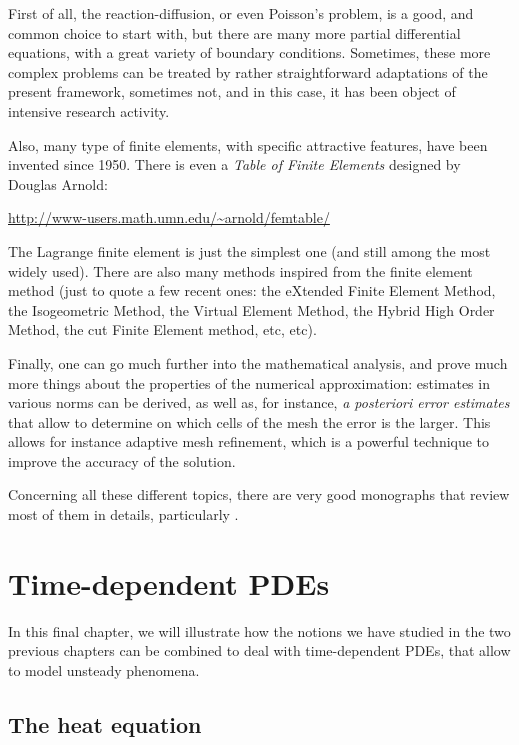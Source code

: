 \documentclass{article}
\begin{document}
First of all, the reaction-diffusion, or even Poisson's problem, is a good, and common choice to start with, but there are many more partial differential equations, with a great variety of boundary conditions. Sometimes, these more complex problems can be treated by rather straightforward adaptations of the present framework, sometimes not, and in this case, it has been object of intensive research activity.

Also, many type of finite elements, with specific attractive features, have been invented since 1950. There is even a \emph{Table of Finite Elements} designed by Douglas Arnold:

\begin{center}
    \url{http://www-users.math.umn.edu/~arnold/femtable/}
\end{center}

The Lagrange finite element is just the simplest one (and still among the most widely used). There are also many methods inspired from the finite element method (just to quote a few recent ones: the eXtended Finite Element Method, the Isogeometric Method, the Virtual Element Method, the Hybrid High Order Method, the cut Finite Element method, etc, etc).

Finally, one can go much further into the mathematical analysis, and prove much more things about the properties of the numerical approximation: estimates in various norms can be derived, as well as, for instance, \emph{a posteriori error estimates} that allow to determine on which cells of the mesh the error is the larger. This allows for instance adaptive mesh refinement, which is a powerful technique to improve the accuracy of the solution.

Concerning all these different topics, there are very good monographs that review most of them in details, particularly
\cite{allaire07,brenner08,ern04,raviart83}.

\newpage

\section{Time-dependent PDEs}

In this final chapter, we will illustrate how the notions we have studied in the two previous chapters can be combined to deal with time-dependent PDEs, that allow to model unsteady phenomena.

\subsection{The heat equation}
\end{document}
